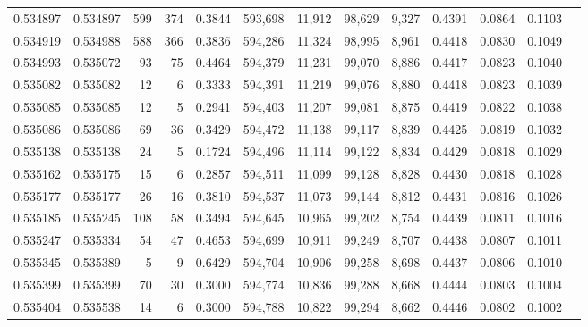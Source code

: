 \begin{tabular}{rrrrrrrrrrrrr}
0.534897 & 0.534897 &   599 &   374 &                                     0.3844 & 593,698 &  11,912 &  98,629 &   9,327 & 0.4391 & 0.0864 & 0.1103 \\
0.534919 & 0.534988 &   588 &   366 &                                     0.3836 & 594,286 &  11,324 &  98,995 &   8,961 & 0.4418 & 0.0830 & 0.1049 \\
0.534993 & 0.535072 &    93 &    75 &                                     0.4464 & 594,379 &  11,231 &  99,070 &   8,886 & 0.4417 & 0.0823 & 0.1040 \\
0.535082 & 0.535082 &    12 &     6 &                                     0.3333 & 594,391 &  11,219 &  99,076 &   8,880 & 0.4418 & 0.0823 & 0.1039 \\
0.535085 & 0.535085 &    12 &     5 &                                     0.2941 & 594,403 &  11,207 &  99,081 &   8,875 & 0.4419 & 0.0822 & 0.1038 \\
0.535086 & 0.535086 &    69 &    36 &                                     0.3429 & 594,472 &  11,138 &  99,117 &   8,839 & 0.4425 & 0.0819 & 0.1032 \\
0.535138 & 0.535138 &    24 &     5 &                                     0.1724 & 594,496 &  11,114 &  99,122 &   8,834 & 0.4429 & 0.0818 & 0.1029 \\
0.535162 & 0.535175 &    15 &     6 &                                     0.2857 & 594,511 &  11,099 &  99,128 &   8,828 & 0.4430 & 0.0818 & 0.1028 \\
0.535177 & 0.535177 &    26 &    16 &                                     0.3810 & 594,537 &  11,073 &  99,144 &   8,812 & 0.4431 & 0.0816 & 0.1026 \\
0.535185 & 0.535245 &   108 &    58 &                                     0.3494 & 594,645 &  10,965 &  99,202 &   8,754 & 0.4439 & 0.0811 & 0.1016 \\
0.535247 & 0.535334 &    54 &    47 &                                     0.4653 & 594,699 &  10,911 &  99,249 &   8,707 & 0.4438 & 0.0807 & 0.1011 \\
0.535345 & 0.535389 &     5 &     9 &                                     0.6429 & 594,704 &  10,906 &  99,258 &   8,698 & 0.4437 & 0.0806 & 0.1010 \\
0.535399 & 0.535399 &    70 &    30 &                                     0.3000 & 594,774 &  10,836 &  99,288 &   8,668 & 0.4444 & 0.0803 & 0.1004 \\
0.535404 & 0.535538 &    14 &     6 &                                     0.3000 & 594,788 &  10,822 &  99,294 &   8,662 & 0.4446 & 0.0802 & 0.1002 \\

\end{tabular}
